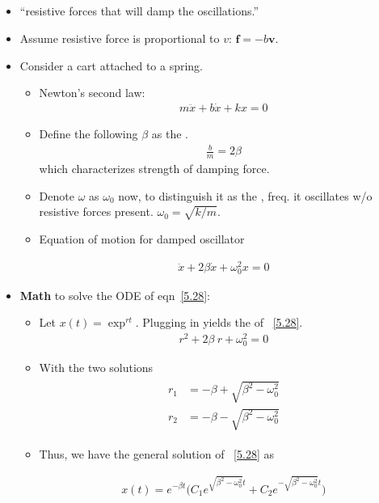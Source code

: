 \documentclass[10pt, twocolumn]{article}
\DeclareRobustCommand{\mybox}[2][gray!20]{%
	\begin{tcolorbox}[   %
		breakable,
		left=0pt,
		right=0pt,
		top=-13pt,
		bottom=0pt,
		colback=#1,
		colframe=#1,
		width=0.45\dimexpr\textwidth\relax,
		enlarge left by=0mm,
		boxsep=1pt,
		arc=0pt,outer arc=0pt,
		]
		#2
	\end{tcolorbox}
}
\begin{document}
\subsection{}
\begin{itemize}
	\item ``\textellipsis resistive forces that will damp the oscillations.''
	\item Assume resistive force is proportional to $v$: $\bm{f} = -b \bm{v}$. 
	\item Consider a cart attached to a spring. 
	\begin{itemize}
		\item Newton's second law:
		\begin{align} \tag{5.24}
			m\ddot{x} + b\dot{x} + kx = 0
			\label{5.24}
		\end{align}
		\item Define the following $\beta$ as the . 
		\begin{align} \tag{5.26}
			\frac{b}{m} = 2 \beta
			\label{5.26}
		\end{align}
		which characterizes strength of damping force. 
		\item Denote $\omega$ as $\omega_0$ now, to distinguish it as the , freq. it oscillates w/o resistive forces present. $\omega_0 = \sqrt{k/m}$. 
	\item Equation of motion for damped oscillator \mybox[gray!20]{
		\begin{align} \tag{5.28}
			\ddot{x} + 2 \beta \dot{x} + \omega_0^2 x = 0
			\label{5.28}
		\end{align}}
	\end{itemize}
	\newpage
	\item \textbf{Math} to solve the ODE of eqn~\ref{5.28}:
	\begin{itemize}
		\item Let $x(t) = \exp^{rt}$. Plugging in yields the  of ~\ref{5.28}.
		\begin{align}
		\tag{5.30}
			r^2 + 2 \beta ~ r + \omega_0^2 = 0
		\label{5.30}
		\end{align}
		\item With the two solutions
		\begin{align}
		\tag{5.31}
		\begin{split}
			r_1 &= - \beta + \sqrt{\beta^2 - \omega_0^2} \\
			r_2 &= - \beta - \sqrt{\beta^2 - \omega_0^2}
		\end{split}
		\label{5.31}
		\end{align}
		\item Thus, we have the general solution of ~\ref{5.28} as \mybox[gray!20]{
			\begin{align} \tag{5.33}
			x(t) = e^{-\beta t} \bigg(C_1 e^{\sqrt{\beta^2 - \omega_0^2}t} + C_2 e^{-\sqrt{\beta^2 - \omega_0^2}t}\bigg)
			\label{5.33}
			\end{align}}
	\end{itemize}
	

\end{itemize}
\end{document}
